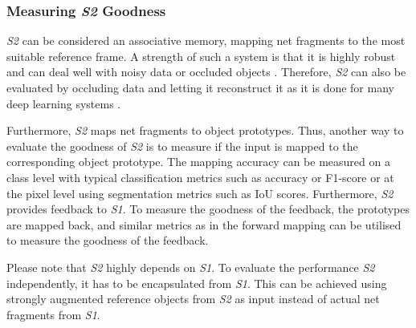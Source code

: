 \subsubsection{Measuring \emph{S2} Goodness}
\emph{S2} can be considered an associative memory, mapping net fragments to the most suitable reference frame.
A strength of such a system is that it is highly robust and can deal well with noisy data or occluded objects .
Therefore, \emph{S2} can also be evaluated by occluding data and letting it reconstruct it as it is done for many deep learning systems . 

Furthermore, \emph{S2} maps net fragments to object prototypes. Thus, another way to evaluate the goodness of \emph{S2} is to measure if the input is mapped to the corresponding object prototype.
The mapping accuracy can be measured on a class level with typical classification metrics such as accuracy or F1-score or at the pixel level using segmentation metrics such as IoU scores.
Furthermore, \emph{S2} provides feedback to \emph{S1}.
To measure the goodness of the feedback, the prototypes are mapped back, and similar metrics as in the forward mapping can be utilised to measure the goodness of the feedback.

Please note that \emph{S2} highly depends on \emph{S1}. To evaluate the performance \emph{S2} independently, it has to be encapsulated from \emph{S1}.
This can be achieved using strongly augmented reference objects from \emph{S2} as input instead of actual net fragments from \emph{S1}.



